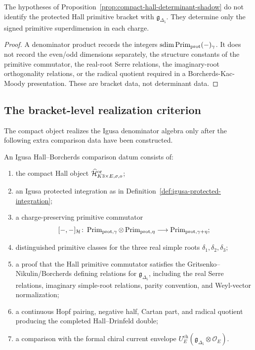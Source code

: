 \begin{corollary}
\label{cor:determinant-not-bracket}
The hypotheses of Proposition~\ref{prop:compact-hall-determinant-shadow}
do not identify the protected Hall primitive bracket with
\(\mathfrak g_{\Delta_5}\).  They determine only the signed primitive
superdimension in each charge.
\end{corollary}

\begin{proof}
A denominator product records the integers
\(\operatorname{sdim}\operatorname{Prim}_{\mathrm{prot}}(-)_\gamma\).  It does not record the
even/odd dimensions separately, the structure constants of the primitive
commutator, the real-root Serre relations, the imaginary-root
orthogonality relations, or the radical quotient required in a
Borcherds-Kac-Moody presentation.  These are bracket data, not
determinant data.
\end{proof}

\subsection{The bracket-level realization criterion}

The compact object realizes the Igusa denominator algebra only after the
following extra comparison data have been constructed.

\begin{definition}
\label{def:igusa-hall-borcherds-comparison}
An Igusa Hall--Borcherds comparison datum consists of:
\begin{enumerate}
\item the compact Hall object
  \(\widehat{\mathcal H}^{\mathrm{or}}_{K3\times E,\sigma,o}\);
\item an Igusa protected integration as in
  Definition~\ref{def:igusa-protected-integration};
\item a charge-preserving primitive commutator
  \[
    [-,-]_{\mathcal H}\colon
    \operatorname{Prim}_{\mathrm{prot},\gamma}\otimes
    \operatorname{Prim}_{\mathrm{prot},\eta}
    \longrightarrow
    \operatorname{Prim}_{\mathrm{prot},\gamma+\eta};
  \]
\item distinguished primitive classes for the three real simple roots
  \(\delta_1,\delta_2,\delta_3\);
\item a proof that the Hall primitive commutator satisfies the
  Gritsenko--Nikulin/Borcherds defining relations for
  \(\mathfrak g_{\Delta_5}\), including the real Serre relations,
  imaginary simple-root relations, parity convention, and Weyl-vector
  normalization;
\item a continuous Hopf pairing, negative half, Cartan part, and
  radical quotient producing the completed Hall--Drinfeld double;
\item a comparison with the formal chiral current envelope
  \(U_E^{\mathrm{ch}}(\mathfrak g_{\Delta_5}\otimes\mathcal O_E)\).
\end{enumerate}
\end{definition}

